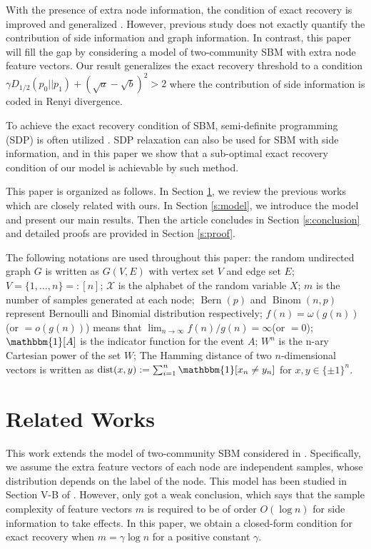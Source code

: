 \documentclass[conference]{IEEEtran}
\DeclareMathOperator{\dist}{dist}
\DeclareMathOperator{\Bern}{Bern}
\DeclareMathOperator{\Binom}{Binom}
\begin{document}
With the presence of extra node information, the condition of exact recovery is improved
and generalized \cite{saad2018community, abbe17sideinfo}. However, previous study does not exactly quantify the contribution of side information and graph information. In contrast, this paper will fill the gap by considering a model of two-community SBM with extra node feature vectors. Our result generalizes
the exact recovery threshold to a condition $\gamma D_{1/2}(p_0 || p_1) + (\sqrt{a} - \sqrt{b})^2 > 2$
where the contribution of side information is coded in Renyi divergence.

To achieve the exact recovery condition of SBM, semi-definite programming (SDP) is often utilized \cite{Hajek16}.
SDP relaxation can also be used for SBM with side information, and in this paper we show that a sub-optimal exact recovery condition
of our model is achievable by such method.

This paper is organized as follows. In Section \ref{s:rw}, we review the previous works which are closely related with ours.
In Section \ref{s:model}, we introduce the model and present our main results.
Then the article concludes in Section \ref{s:conclusion} and
detailed proofs are provided in Section \ref{s:proof}.

The following notations are used throughout this paper: 
the random undirected graph $G$ is written as $G(V,E)$ with vertex set $V$ and edge set $E$;
$V=\{1,\dots, n\} =: [n]$;
$\mathcal{X}$ is the alphabet
of the random variable $X$; $m$ is the number of samples generated at each node;
$\Bern(p)$ and $\Binom(n,p)$ represent Bernoulli
and Binomial distribution respectively; $f(n)=\omega(g(n))$(or $=o(g(n))$) means that $\lim_{n\to \infty} f(n) / g(n) = \infty $(or $=0$);
$\mathbbm{1}[A]$ is the indicator function for the event $A$; $W^n$ is the n-ary Cartesian power of the set $W$;
The Hamming distance of 
two $n$-dimensional vectors is written as $\dist(x,y):=\sum_{i=1}^n \mathbbm{1}[x_n\neq y_n]$ for $x,y\in \{\pm 1 \}^n$.

\section{Related Works}\label{s:rw}
This work extends the model of two-community SBM considered in \cite{abbe2015community}.
Specifically, we assume the extra feature vectors of each node are independent samples, whose distribution depends on the label of the node.
This model has been studied in Section V-B of \cite{saad2018community}. However,
\cite{saad2018community} only got a weak conclusion, which says that the sample complexity of feature vectors
$m$ is required to be of order $O(\log n)$ for side information to take effects. In this paper, we obtain
a closed-form condition for exact recovery when $m=\gamma \log n$ for a positive constant $\gamma$.
\end{document}

